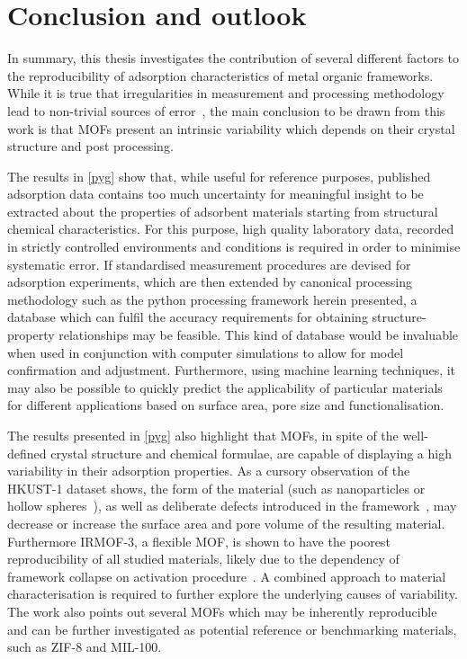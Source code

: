 
\graphicspath{ {\thisch/figures/} }

\chapter*{Conclusion and outlook}\label{conclusion}

In summary, this thesis investigates the contribution of several
different factors to the reproducibility of adsorption characteristics
of metal organic frameworks. While it is true that irregularities 
in measurement and processing methodology lead to non-trivial
sources of error~\cite{nguyenReferenceHighpressureCO22018, %
parkHowReproducibleAre2017}, the main conclusion to be drawn 
from this work is that MOFs
present an intrinsic variability which depends on their crystal
structure and post processing.

The results in \autoref{pyg} show that, while useful for reference
purposes, published adsorption data contains too much
uncertainty for meaningful insight to be extracted about the properties
of adsorbent materials starting from structural chemical characteristics.
For this purpose, high quality laboratory data, recorded in strictly 
controlled environments and conditions is required in order to 
minimise systematic error. If standardised measurement procedures 
are devised for adsorption experiments, which are then extended 
by canonical processing methodology such as the python processing 
framework herein presented, a database which can fulfil the accuracy
requirements for obtaining structure-property relationships may be
feasible. This kind of database would be invaluable when used in
conjunction with computer simulations
to allow for model confirmation and adjustment. Furthermore, using machine
learning techniques, it may also be possible to quickly predict the
applicability of particular materials for different applications
based on surface area, pore size and functionalisation.

The results presented in \autoref{pyg} also highlight that
MOFs, in spite of the well-defined crystal structure and chemical formulae,
are capable of displaying a high variability in their adsorption
properties. 
As a cursory observation of the HKUST-1 dataset shows, the form of the 
material (such as nanoparticles or hollow
spheres~\cite{liControllableSynthesisMetal2013}), as well as 
deliberate defects introduced in the 
framework~\cite{barinDefectCreationLinker2014}, may decrease or 
increase the surface area and pore volume of the resulting material.
Furthermore IRMOF-3, a flexible MOF, 
is shown to have the poorest reproducibility of all studied materials,
likely due to the dependency of framework collapse on 
activation procedure~\cite{engelActivationDependentBreathingFlexible2017}.
A combined approach to material characterisation
is required to further explore the underlying causes of variability.
The work also points out several MOFs which may
be inherently reproducible and can be further investigated as 
potential reference or benchmarking materials, such as 
ZIF-8 and MIL-100.

